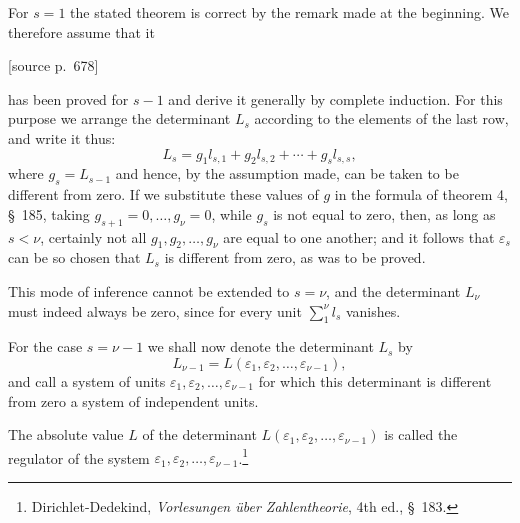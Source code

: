\documentclass[11pt]{article}
\newcommand{\srcpage}[1]{\par\medskip\noindent\textsf{[source p.~#1]}\par\smallskip}
\begin{document}
For $s=1$ the stated theorem is correct by the remark made at the beginning. We therefore assume that it
\srcpage{678}
has been proved for $s-1$ and derive it generally by complete induction. For this purpose we arrange the determinant $L_s$ according to the elements of the last row, and write it thus:
\begin{equation}
L_s=g_1l_{s,1}+g_2l_{s,2}+\cdots+g_sl_{s,s},
\tag{2}
\end{equation}
where $g_s=L_{s-1}$ and hence, by the assumption made, can be taken to be different from zero. If we substitute these values of $g$ in the formula of theorem 4, \S~185, taking $g_{s+1}=0,\ldots,g_\nu=0$, while $g_s$ is not equal to zero, then, as long as $s<\nu$, certainly not all $g_1,g_2,\ldots,g_\nu$ are equal to one another; and it follows that $\varepsilon_s$ can be so chosen that $L_s$ is different from zero, as was to be proved.

This mode of inference cannot be extended to $s=\nu$, and the determinant $L_\nu$ must indeed always be zero, since for every unit $\sum_{1}^{\nu} l_s$ vanishes.

For the case $s=\nu-1$ we shall now denote the determinant $L_s$ by
\begin{equation}
L_{\nu-1}=L(\varepsilon_1,\varepsilon_2,\ldots,\varepsilon_{\nu-1}),
\tag{3}
\end{equation}
and call a system of units $\varepsilon_1,\varepsilon_2,\ldots,\varepsilon_{\nu-1}$ for which this determinant is different from zero a system of independent units.

The absolute value $L$ of the determinant $L(\varepsilon_1,\varepsilon_2,\ldots,\varepsilon_{\nu-1})$ is called the regulator of the system $\varepsilon_1,\varepsilon_2,\ldots,\varepsilon_{\nu-1}$.\footnote{Dirichlet-Dedekind, \textit{Vorlesungen über Zahlentheorie}, 4th ed., \S~183.}
\end{document}
